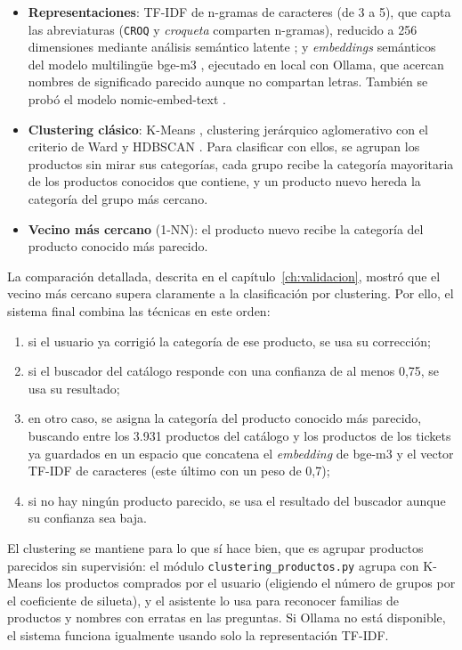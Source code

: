 \begin{itemize}
    \item \textbf{Representaciones}: TF-IDF de n-gramas de caracteres (de 3 a 5), que capta las abreviaturas (\texttt{CROQ} y \textit{croqueta} comparten n-gramas), reducido a 256 dimensiones mediante análisis semántico latente \parencite{deerwester1990lsa}; y \textit{embeddings} semánticos del modelo multilingüe bge-m3 \parencite{chen2024bgem3}, ejecutado en local con Ollama, que acercan nombres de significado parecido aunque no compartan letras. También se probó el modelo nomic-embed-text \parencite{nussbaum2024nomic}.
    \item \textbf{Clustering clásico}: K-Means \parencite{lloyd1982kmeans}, clustering jerárquico aglomerativo con el criterio de Ward \parencite{ward1963hierarchical} y HDBSCAN \parencite{campello2013hdbscan}. Para clasificar con ellos, se agrupan los productos sin mirar sus categorías, cada grupo recibe la categoría mayoritaria de los productos conocidos que contiene, y un producto nuevo hereda la categoría del grupo más cercano.
    \item \textbf{Vecino más cercano} (1-NN): el producto nuevo recibe la categoría del producto conocido más parecido.
\end{itemize}

La comparación detallada, descrita en el capítulo~\ref{ch:validacion}, mostró que el vecino más cercano supera claramente a la clasificación por clustering. Por ello, el sistema final combina las técnicas en este orden:

\begin{enumerate}
    \item si el usuario ya corrigió la categoría de ese producto, se usa su corrección;
    \item si el buscador del catálogo responde con una confianza de al menos 0,75, se usa su resultado;
    \item en otro caso, se asigna la categoría del producto conocido más parecido, buscando entre los 3.931 productos del catálogo y los productos de los tickets ya guardados en un espacio que concatena el \textit{embedding} de bge-m3 y el vector TF-IDF de caracteres (este último con un peso de 0,7);
    \item si no hay ningún producto parecido, se usa el resultado del buscador aunque su confianza sea baja.
\end{enumerate}

El clustering se mantiene para lo que sí hace bien, que es agrupar productos parecidos sin supervisión: el módulo \texttt{clustering\_productos.py} agrupa con K-Means los productos comprados por el usuario (eligiendo el número de grupos por el coeficiente de silueta), y el asistente lo usa para reconocer familias de productos y nombres con erratas en las preguntas. Si Ollama no está disponible, el sistema funciona igualmente usando solo la representación TF-IDF.

